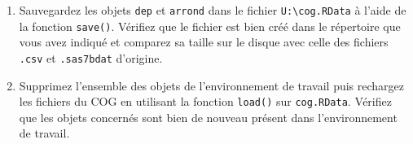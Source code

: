 \documentclass[12pt,twosided, notitlepage]{book}
\newenvironment{Shaded}{}{}
\newcommand{\KeywordTok}[1]{\textcolor[rgb]{0.00,0.00,1.00}{#1}}
\newcommand{\DataTypeTok}[1]{#1}
\newcommand{\StringTok}[1]{\textcolor[rgb]{0.00,0.50,0.50}{#1}}
\newcommand{\CommentTok}[1]{\textcolor[rgb]{0.00,0.50,0.00}{#1}}
\newcommand{\NormalTok}[1]{#1}
\newif \ifsol
\renewenvironment{Shaded}{\begin{snugshade}}{\end{snugshade}}
\begin{document}
\begin{enumerate}
  \begin{center} \rule{0.5\linewidth}{\linethickness}\end{center}

  \bigskip  \fi 
\item
  Sauvegardez les objets \texttt{dep} et \texttt{arrond} dans le fichier
  \texttt{U:\textbackslash{}cog.RData} à l'aide de la fonction
  \texttt{save()}. Vérifiez que le fichier est bien
  créé dans le répertoire que vous avez indiqué et comparez sa taille
  sur le disque avec celle des fichiers \texttt{.csv} et
  \texttt{.sas7bdat} d'origine.

  \ifsol 

  \begin{center} \rule{0.5\linewidth}{\linethickness}\end{center}

\begin{Shaded}
\begin{Highlighting}[]
\CommentTok{# Sauvegarde des objets du COG dans cog.RData}
\KeywordTok{save}\NormalTok{(dep, arrond, }\DataTypeTok{file =} \StringTok{"U:/cog.RData"}\NormalTok{)}
\end{Highlighting}
\end{Shaded}

  \begin{center} \rule{0.5\linewidth}{\linethickness}\end{center}

  \bigskip  \fi 
\item
  Supprimez l'ensemble des objets de l'environnement de travail puis
  rechargez les fichiers du COG en utilisant la fonction
  \texttt{load()} sur \texttt{cog.RData}. Vérifiez
  que les objets concernés sont bien de nouveau présent dans
  l'environnement de travail.

  \ifsol 

  \begin{center} \rule{0.5\linewidth}{\linethickness}\end{center}

\begin{Shaded}
\begin{Highlighting}[]
\CommentTok{# Suppression de tous les fichiers de l'environnement de travail}
\KeywordTok{rm}\NormalTok{(}\DataTypeTok{list =} \KeywordTok{ls}\NormalTok{())}
\KeywordTok{ls}\NormalTok{()}

\CommentTok{# Chargement des fichiers du COG}
\KeywordTok{load}\NormalTok{(}\StringTok{"U:/cog.RData"}\NormalTok{)}
\KeywordTok{ls}\NormalTok{()}
\end{Highlighting}
\end{Shaded}

\begin{verbatim}
  ## [1] "arrond" "dep"
\end{verbatim}

  \begin{center} \rule{0.5\linewidth}{\linethickness}\end{center}

  \bigskip  \fi 
\end{enumerate}
\end{document}
